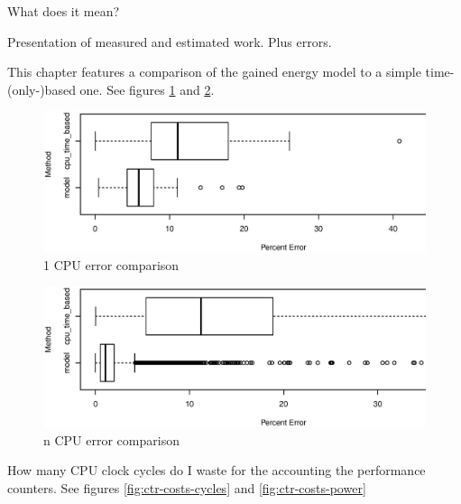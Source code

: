 \label{sec:evaluation}

What does it mean?


\label{sec:error}

Presentation of measured and estimated work. Plus errors.


\label{sec:time-based}

This chapter features a comparison of the gained energy model to a simple
time-(only-)based one. See figures \ref{fig:errs-1cpu} and \ref{fig:errs-ncpu}.

\begin{figure}
  \centering
    \includegraphics[width=\textwidth]{fig/1cpu-bench-errs.eps}
  \caption{1 CPU error comparison}
  \label{fig:errs-1cpu}
\end{figure}

\begin{figure}
  \centering
    \includegraphics[width=\textwidth]{fig/Ncpu-bench-errs.eps}
  \caption{n CPU error comparison}
  \label{fig:errs-ncpu}
\end{figure}



\label{sec:overhead}

How many CPU clock cycles do I waste for the accounting the performance
counters. See figures \ref{fig:ctr-costs-cycles} and \ref{fig:ctr-costs-power}

